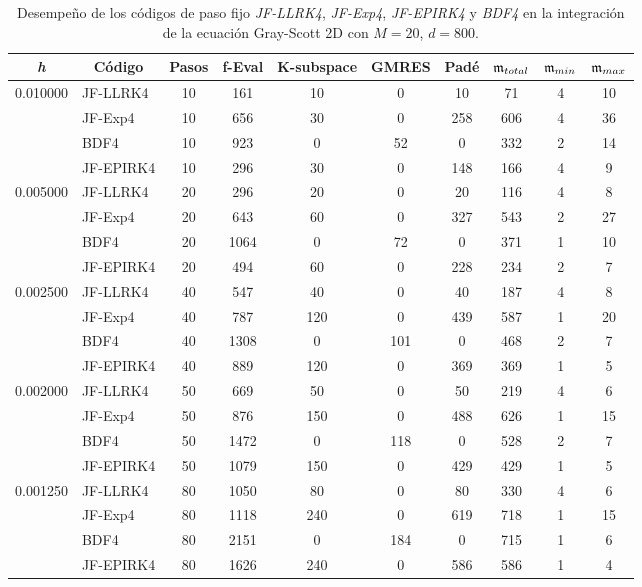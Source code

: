 \begin{table}[htb]
	\caption{Desempeño de los códigos de paso fijo \textit{JF-LLRK4}, \textit{JF-Exp4}, \textit{JF-EPIRK4} y \textit{BDF4} en la integración de la ecuación Gray-Scott 2D con $M=20$, $d=800$.}
	\centering
	\begin{adjustbox}{width=0.9\columnwidth,center}
		\begin{tabular}{cccccccccc}
			\hline
			\textit{h} & Código & Pasos & f-Eval & K-subspace & GMRES & Padé & $\mathfrak{m}_{total}$ & $\mf%
			_{min}$ & $\mathfrak{m}_{max}$ \\ \hline
			0.010000 & \multicolumn{1}{l}{JF-LLRK4} & 10 & 161 & 10 & 0 & 10 & 71 & 4 &
			10 \\
			& \multicolumn{1}{l}{JF-Exp4} & 10 & 656 & 30 & 0 & 258 & 606 & 4 & 36 \\
			& \multicolumn{1}{l}{BDF4} & 10 & 923 & 0 & 52 & 0 & 332 & 2 & 14 \\
			& \multicolumn{1}{l}{JF-EPIRK4} & 10 & 296 & 30 & 0 & 148 & 166 & 4 & 9 \\
			0.005000 & \multicolumn{1}{l}{JF-LLRK4} & 20 & 296 & 20 & 0 & 20 & 116 & 4 &
			8 \\
			& \multicolumn{1}{l}{JF-Exp4} & 20 & 643 & 60 & 0 & 327 & 543 & 2 & 27 \\
			& \multicolumn{1}{l}{BDF4} & 20 & 1064 & 0 & 72 & 0 & 371 & 1 & 10 \\
			& \multicolumn{1}{l}{JF-EPIRK4} & 20 & 494 & 60 & 0 & 228 & 234 & 2 & 7 \\
			0.002500 & \multicolumn{1}{l}{JF-LLRK4} & 40 & 547 & 40 & 0 & 40 & 187 & 4 &
			8 \\
			& \multicolumn{1}{l}{JF-Exp4} & 40 & 787 & 120 & 0 & 439 & 587 & 1 & 20 \\
			& \multicolumn{1}{l}{BDF4} & 40 & 1308 & 0 & 101 & 0 & 468 & 2 & 7 \\
			& \multicolumn{1}{l}{JF-EPIRK4} & 40 & 889 & 120 & 0 & 369 & 369 & 1 & 5 \\
			0.002000 & \multicolumn{1}{l}{JF-LLRK4} & 50 & 669 & 50 & 0 & 50 & 219 & 4 &
			6 \\
			& \multicolumn{1}{l}{JF-Exp4} & 50 & 876 & 150 & 0 & 488 & 626 & 1 & 15 \\
			& \multicolumn{1}{l}{BDF4} & 50 & 1472 & 0 & 118 & 0 & 528 & 2 & 7 \\
			& \multicolumn{1}{l}{JF-EPIRK4} & 50 & 1079 & 150 & 0 & 429 & 429 & 1 & 5 \\
			0.001250 & \multicolumn{1}{l}{JF-LLRK4} & 80 & 1050 & 80 & 0 & 80 & 330 & 4
			& 6 \\
			& \multicolumn{1}{l}{JF-Exp4} & 80 & 1118 & 240 & 0 & 619 & 718 & 1 & 15 \\
			& \multicolumn{1}{l}{BDF4} & 80 & 2151 & 0 & 184 & 0 & 715 & 1 & 6 \\
			& \multicolumn{1}{l}{JF-EPIRK4} & 80 & 1626 & 240 & 0 & 586 & 586 & 1 & 4 \\
			\hline
		\end{tabular}
	\end{adjustbox}
	\label{tab:gs2d}
\end{table}


